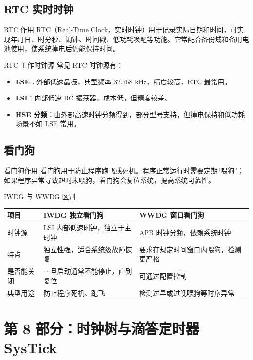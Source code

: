 \documentclass[UTF8,fontset=none,12pt]{ctexart}
\begin{document}
\subsection{RTC 实时时钟}
\begin{pointbox}{RTC 作用}
RTC（Real-Time Clock，实时时钟）用于记录实际日期和时间，可实现年月日、时分秒、闹钟、时间戳、低功耗唤醒等功能。它常配合备份域和备用电池使用，使系统掉电后仍能保持时间。
\end{pointbox}

\begin{pointbox}{RTC 工作时钟源}
常见 RTC 时钟源有：
\begin{itemize}
  \item \textbf{LSE}：外部低速晶振，典型频率 32.768 kHz，精度较高，RTC 最常用。
  \item \textbf{LSI}：内部低速 RC 振荡器，成本低，但精度较差。
  \item \textbf{HSE 分频}：由外部高速时钟分频得到，部分型号支持，但掉电保持和低功耗场景不如 LSE 常用。
\end{itemize}
\end{pointbox}

\subsection{看门狗}
\begin{pointbox}{看门狗作用}
看门狗用于防止程序跑飞或死机。程序正常运行时需要定期“喂狗”；如果程序异常导致超时未喂狗，看门狗会复位系统，提高系统可靠性。
\end{pointbox}

\begin{pointbox}{IWDG 与 WWDG 区别}
	\begin{tabularx}{\linewidth}{@{}p{3cm}p{5.5cm}Y@{}}
\toprule
\textbf{项目} & \textbf{IWDG 独立看门狗} & \textbf{WWDG 窗口看门狗} \\
\midrule
时钟源 & LSI 内部低速时钟，独立于主时钟 & APB 时钟分频，依赖系统时钟 \\
特点 & 独立性强，适合系统级故障恢复 & 要求在规定时间窗口内喂狗，检测更严格 \\
是否能关闭 & 一旦启动通常不能停止，直到复位 & 可通过配置控制 \\
典型用途 & 防止程序死机、跑飞 & 检测过早或过晚喂狗等时序异常 \\
\bottomrule
\end{tabularx}
\end{pointbox}

\section{第 8 部分：时钟树与滴答定时器 SysTick}
\end{document}
